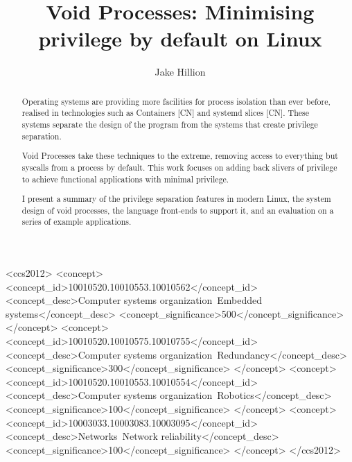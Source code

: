 \documentclass[sigplan]{acmart}
\begin{document}
\title[Void Processes]{Void Processes: Minimising privilege by default on Linux}

\author{Jake Hillion}


\begin{abstract}
Operating systems are providing more facilities for process isolation than ever before, realised in technologies such as Containers [CN] and systemd slices [CN]. These systems separate the design of the program from the systems that create privilege separation.
  
Void Processes take these techniques to the extreme, removing access to everything but syscalls from a process by default. This work focuses on adding back slivers of privilege to achieve functional applications with minimal privilege.
  
I present a summary of the privilege separation features in modern Linux, the system design of void processes, the language front-ends to support it, and an evaluation on a series of example applications. 
\end{abstract}

\begin{CCSXML}
<ccs2012>
 <concept>
  <concept_id>10010520.10010553.10010562</concept_id>
  <concept_desc>Computer systems organization~Embedded systems</concept_desc>
  <concept_significance>500</concept_significance>
 </concept>
 <concept>
  <concept_id>10010520.10010575.10010755</concept_id>
  <concept_desc>Computer systems organization~Redundancy</concept_desc>
  <concept_significance>300</concept_significance>
 </concept>
 <concept>
  <concept_id>10010520.10010553.10010554</concept_id>
  <concept_desc>Computer systems organization~Robotics</concept_desc>
  <concept_significance>100</concept_significance>
 </concept>
 <concept>
  <concept_id>10003033.10003083.10003095</concept_id>
  <concept_desc>Networks~Network reliability</concept_desc>
  <concept_significance>100</concept_significance>
 </concept>
</ccs2012>
\end{CCSXML}
\end{document}
